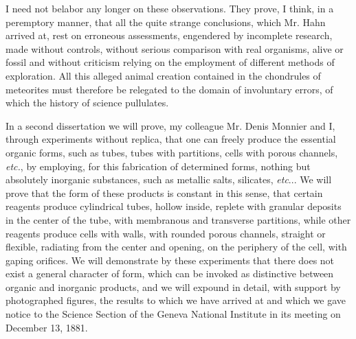 \documentclass[a4paper, 12pt, oneside]{article}
\begin{document}
I need not belabor any longer on these observations. They prove, I think, in a peremptory manner, that all the quite strange conclusions, which Mr. Hahn arrived at, rest on erroneous assessments, engendered by incomplete research, made without controls, without serious comparison with real organisms, alive or fossil and without criticism relying on the employment of different methods of exploration. All this alleged animal creation contained in the chondrules of meteorites must therefore be relegated to the domain of involuntary errors, of which the history of science pullulates.

In a second dissertation we will prove, my colleague Mr. Denis Monnier and I, through experiments without replica, that one can freely produce the essential organic forms, such as tubes, tubes with partitions, cells with porous channels, \emph{etc.}, by employing, for this fabrication of determined forms, nothing but absolutely inorganic substances, such as metallic salts, silicates, \emph{etc}... We will prove that the form of these products is constant in this sense, that certain reagents produce cylindrical tubes, hollow inside, replete with granular deposits in the center of the tube, with membranous and transverse partitions, while other reagents produce cells with walls, with rounded porous channels, straight or flexible, radiating from the center and opening, on the periphery of the cell, with gaping orifices. We will demonstrate by these experiments that there does not exist a general character of form, which can be invoked as distinctive between organic and inorganic products, and we will expound in detail, with support by photographed figures, the results to which we have arrived at and which we gave notice to the Science Section of the Geneva National Institute in its meeting on December 13, 1881.
\end{document}
